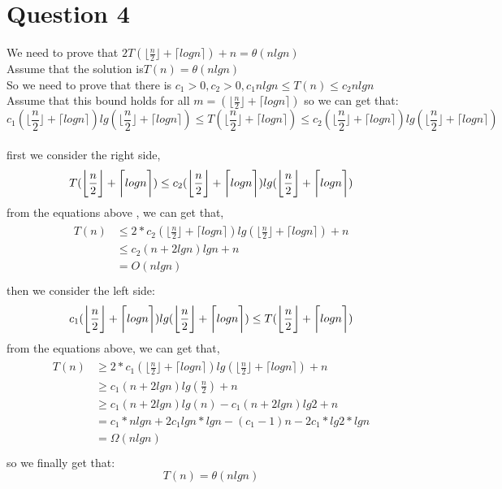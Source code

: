 \documentclass[paper=a4, fontsize=11pt]{scrartcl} %
\numberwithin{equation}{section} %
\numberwithin{figure}{section} %
\numberwithin{table}{section} %
\begin{document}
\section{Question 4}
We need to prove that $2T(\biggl\lfloor\frac n 2\biggr\rfloor+\biggl\lceil logn\biggr\rceil)+n=\theta{(nlgn)}$\\
Assume that the solution is$T(n)=\theta(n lgn)$\\
So we need to prove that there is $c_1>0, c_2>0, c_1nlgn \leq T(n)\leq c_2nlgn$ \\
Assume that this bound holds for all $m=(\biggl\lfloor\frac n 2\biggr\rfloor+\biggl\lceil logn\biggr\rceil)$
so we can get that:\\
$$c_1(\biggl\lfloor\frac n 2\biggr\rfloor+\biggl\lceil logn\biggr\rceil) lg(\biggl\lfloor\frac n 2\biggr\rfloor+\biggl\lceil logn\biggr\rceil) \leq T(\biggl\lfloor\frac n 2\biggr\rfloor+\biggl\lceil logn\biggr\rceil) \leq c_2(\biggl\lfloor\frac n 2\biggr\rfloor+\biggl\lceil logn\biggr\rceil) lg(\biggl\lfloor\frac n 2\biggr\rfloor+\biggl\lceil logn\biggr\rceil)$$\\
first we consider the right side,\\
$$
T(\biggl\lfloor\frac n 2\biggr\rfloor+\biggl\lceil logn\biggr\rceil) \leq c_2(\biggl\lfloor\frac n 2\biggr\rfloor+\biggl\lceil logn\biggr\rceil) lg(\biggl\lfloor\frac n 2\biggr\rfloor+\biggl\lceil logn\biggr\rceil)\\$$
from the equations above , we can get that,\\
\begin{align*}
\begin{split}
T(n) &\leq 2*c_2(\biggl\lfloor\frac n 2\biggr\rfloor+\biggl\lceil logn\biggr\rceil) lg(\biggl\lfloor\frac n 2\biggr\rfloor+\biggl\lceil logn\biggr\rceil)+n\\
& \leq c_2(n+2lgn)lgn+n\\
&=O(nlgn)\\
\end{split}
\end{align*}
then we consider the left side:\\
$$ c_1(\biggl\lfloor\frac n 2\biggr\rfloor+\biggl\lceil logn\biggr\rceil) lg(\biggl\lfloor\frac n 2\biggr\rfloor+\biggl\lceil logn\biggr\rceil)\leq T(\biggl\lfloor\frac n 2\biggr\rfloor+\biggl\lceil logn\biggr\rceil)\\$$
from the equations above, we can get that,\\
\begin{align*}
\begin{split}
T(n) &\geq 2*c_1(\biggl\lfloor\frac n 2\biggr\rfloor+\biggl\lceil logn\biggr\rceil) lg(\biggl\lfloor\frac n 2\biggr\rfloor+\biggl\lceil logn\biggr\rceil)+n\\
& \geq c_1(n+2lgn)lg(\frac{n}{2})+n\\
& \geq c_1(n+2lgn)lg(n)-c_1(n+2lgn)lg2+n\\
&= c_1*nlgn+2c_1lgn*lgn-(c_1-1)n-2c_1*lg2*lgn\\
&= \Omega(nlgn)\\
\end{split}
\end{align*}
so we finally get that:\\
$$ T(n)= \theta(nlgn)$$
\end{document}
